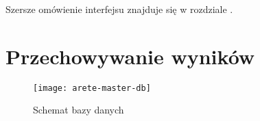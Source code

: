 \documentclass[00-praca-magisterska.tex]{subfiles}
\begin{document}
Szersze omówienie interfejsu  znajduje się w rozdziale
.

\section{Przechowywanie wyników}

\begin{figure}[htb]
\begin{center}
\leavevmode
\texttt{[image: arete-master-db]}
\end{center}
\caption{Schemat bazy danych}
\label{fig:arete-master-db}
\end{figure}
\end{document}
